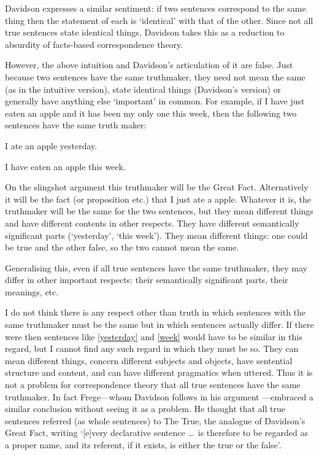 Davidson expresses a similar sentiment: if two sentences correspond to the same thing then the statement of each is `identical' with that of the other.
Since not all true sentences state identical things, Davidson takes this as a reduction to absurdity of facts-based correspondence theory.
\parencite[750]{Davidson_1969}

However, the above intuition and Davidson's articulation of it are false.
Just because two sentences have the same truthmaker, they need not mean the same (as in the intuitive version), state identical things (Davidson's version) or generally have anything else `important' in common.
For example, if I have just eaten an apple and it has been my only one this week, then the following two sentences have the same truth maker:

	\begin{example}\label{yesterday}
	I ate an apple yesterday.
	\end{example}

	\begin{example}\label{week}
	I have eaten an apple this week.
	\end{example}

On the slingshot argument this truthmaker will be the Great Fact.
Alternatively it will be the fact (or proposition etc.) that I just ate a apple.
Whatever it is, the truthmaker will be the same for the two sentences, but they mean different things and have different contents in other respects.
They have different semantically significant parts (`yesterday', `this week').
They mean different things: one could be true and the other false, so the two cannot mean the same.

Generalising this, even if all true sentences have the same truthmaker, they may differ in other important respects: their semantically significant parts, their meanings, etc.

I do not think there is any respect other than truth in which sentences with the same truthmaker must be the same but in which sentences actually differ. 
If there were then sentences like \ref{yesterday} and \ref{week} would have to be similar in this regard, but I cannot find any such regard in which they must be so.
They can mean different things, concern different subjects and objects, have sentential structure and content, and can have different pragmatics when uttered.
Thus it is not a problem for correspondence theory that all true sentences have the same truthmaker.
In fact Frege---whom Davidson follows in his argument \parencite[750]{Davidson_1969}---embraced a similar conclusion without seeing it as a problem.
He thought that all true sentences referred (as whole sentences) to The True, the analogue of Davidson's Great Fact, writing `[e]very declarative sentence \ldots\ is therefore to be regarded as a proper name, and its referent, if it exists, is either the true or the false'.
\parencite[216]{Frege_1948}

